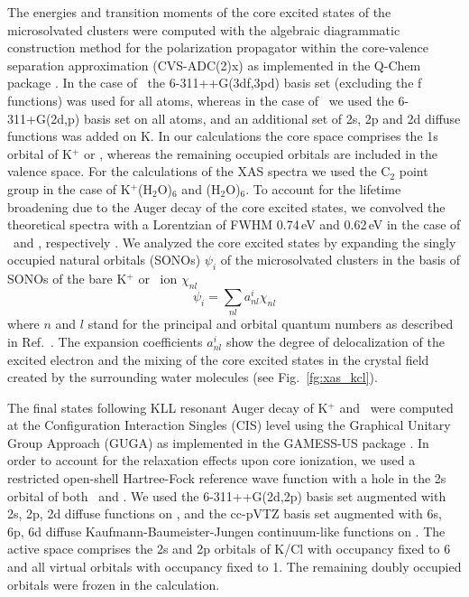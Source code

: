 The energies and transition moments of the core excited states of the microsolvated clusters were computed with the algebraic diagrammatic construction method for the polarization propagator \citep{sch82:2395} within the core-valence separation approximation \citep{bar85:867,ced80:206,ced81:1038} (CVS-ADC(2)x) as implemented in the Q-Chem package \citep{Wenzel14:1900,Wenzel14:4583,Wormit14:774,QChem2015}. In the case of \cli~the 6-311++G(3df,3pd) basis set \citep{Krishnan80:650,McLean80:5639} (excluding the f functions) was used for all atoms, whereas in the case of \ki~we used the 6-311+G(2d,p) basis set \citep{Krishnan80:650,Blaudeau97:5016} on all atoms, and an additional set of 2s, 2p and 2d diffuse functions was added on K. In our calculations the core space comprises the 1s orbital of K$^{+}$ or \cli, whereas the remaining occupied orbitals are included in the valence space. For the calculations of the XAS spectra we used the C$_2$ point group in the case of K$^{+}$(H$_2$O)$_6$ and \cli(H$_2$O)$_6$. To account for the lifetime broadening due to the Auger decay of the core excited states, we convolved the theoretical spectra with a Lorentzian of FWHM 0.74\,eV and 0.62\,eV in the case of \ki~and \cli, respectively \citep{Krause79:329}. We analyzed the core excited states by expanding the singly occupied natural orbitals (SONOs) $\psi_{i}$ of the microsolvated clusters in the basis of SONOs of the bare K$^{+}$ or \cli~ion $\chi_{nl}$
%
\begin{equation}\label{eq:sono_proj}
\psi_{i} = \sum_{nl} a^{i}_{nl} \chi_{nl}
\end{equation}
%
where $n$ and $l$ stand for the principal and orbital quantum numbers as described in Ref.\ \citep{miteva16:16671}. The expansion coefficients $a^{i}_{nl}$ show the degree of delocalization of the excited electron and the mixing of the core excited states in the crystal field created by the surrounding water molecules (see Fig.\ \ref{fg:xas_kcl}).


The final states following KLL resonant Auger decay of K$^{+}$ and \cli~were computed at the Configuration Interaction Singles (CIS) level using the Graphical Unitary Group Approach (GUGA) as implemented in the GAMESS-US package \citep{GUGA_PhysScr_21,GUGA_JCP_70,GUS}. In order to account for the relaxation effects upon core ionization, we used a restricted open-shell Hartree-Fock reference wave function with a hole in the 2s orbital of both \ki~and \cli.  We used the 6-311++G(2d,2p) basis set \citep{Blaudeau97:5016} augmented with 2s, 2p, 2d diffuse functions on \ki, and the cc-pVTZ basis set augmented with 6s, 6p, 6d diffuse Kaufmann-Baumeister-Jungen continuum-like functions \citep{Kaufmann89:2223} on \cli. The active space comprises the 2s and 2p orbitals of K/Cl with occupancy fixed to 6 and all virtual orbitals with occupancy fixed to 1. The remaining doubly occupied orbitals were frozen in the calculation. \citep{mosnier16:061401}